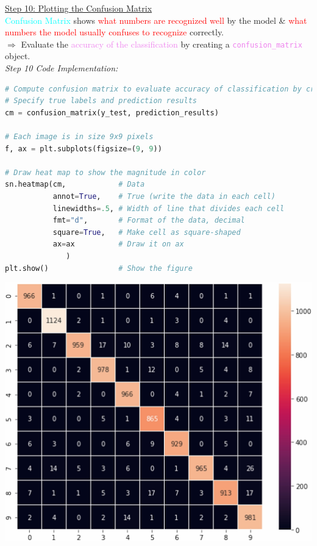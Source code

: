 \documentclass{book}
\begin{document}
\newpage
\uline{Step 10: Plotting the Confusion Matrix}\\
\textcolor{cyan}{Confusion Matrix} shows \textcolor{red}{what numbers are recognized well} by the model \& \textcolor{red}{what numbers the model usually confuses to recognize} correctly.\\
$\Rightarrow$ Evaluate the \textcolor{violet}{accuracy of the classification} by creating a \textcolor{violet}{\texttt{confusion\_matrix}} object.\\
\vspace{3mm}
\textit{\large{Step 10 Code Implementation:}}
\begin{lstlisting}[language=Python, basicstyle=\ttfamily\small, keywordstyle=\color{blue}, commentstyle=\color{forestgreen}, stringstyle=\color{red}, showstringspaces=false]
# Compute confusion matrix to evaluate accuracy of classification by creating confusion_matrix object
# Specify true labels and prediction results
cm = confusion_matrix(y_test, prediction_results)

# Each image is in size 9x9 pixels
f, ax = plt.subplots(figsize=(9, 9))

# Draw heat map to show the magnitude in color
sn.heatmap(cm,            # Data
           annot=True,    # True (write the data in each cell)
           linewidths=.5, # Width of line that divides each cell
           fmt="d",       # Format of the data, decimal
           square=True,   # Make cell as square-shaped
           ax=ax          # Draw it on ax
              )
plt.show()                # Show the figure
\end{lstlisting}
\begin{center}
    \includegraphics[scale=0.25]{chapter 7/ch7_figure20.jpeg}
\end{center}
\end{document}
